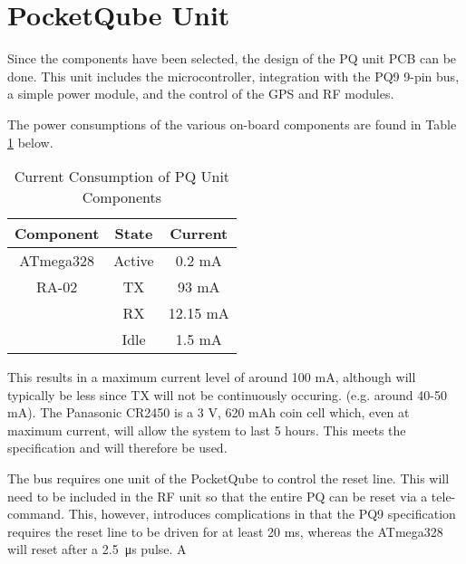 \section{PocketQube Unit}

Since the components have been selected, the design of the PQ unit PCB can be done. This unit includes the microcontroller, integration with the PQ9 9-pin bus, a simple power module, and the control of the GPS and RF modules.

The power consumptions of the various on-board components are found in Table \ref{tab:pqunit_component_current} below.
\begin{table}[!htb]
  \centering
  \renewcommand{\arraystretch}{1.2}
  \begin{tabular}{ |c|c|c| }
  \hline
  \textbf{Component}        & \textbf{State}        & \textbf{Current}      \\ \hline 
  ATmega328                 & Active                & 0.2 mA                \\ \hline 
  RA-02                     & TX                    & 93 mA                 \\ \hline 
                            & RX                    & 12.15 mA              \\ \hline 
                            & Idle                  & 1.5 mA                \\ \hline 
  \hline  \end{tabular}
  \caption{Current Consumption of PQ Unit Components}
  \label{tab:pqunit_component_current}
\end{table}

\noindent This results in a maximum current level of around 100 mA, although will typically be less since TX will not be continuously occuring. (e.g. around 40-50 mA). The Panasonic CR2450 is a 3 V, 620 mAh coin cell which, even at maximum current, will allow the system to last 5 hours. This meets the specification and will therefore be used.    

The bus requires one unit of the PocketQube to control the reset line. This will need to be included in the RF unit so that the entire PQ can be reset via a tele-command. This, however, introduces complications in that the PQ9 specification requires the reset line to be driven for at least 20 ms, whereas the ATmega328 will reset after a \SI{2.5}{\micro \second} pulse. A 